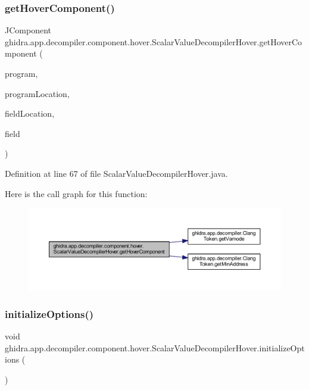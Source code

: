 \subsubsection{\texorpdfstring{getHoverComponent()}{getHoverComponent()}}
{\footnotesize\ttfamily J\+Component ghidra.\+app.\+decompiler.\+component.\+hover.\+Scalar\+Value\+Decompiler\+Hover.\+get\+Hover\+Component (\begin{DoxyParamCaption}\item[{Program}]{program,  }\item[{Program\+Location}]{program\+Location,  }\item[{Field\+Location}]{field\+Location,  }\item[{Field}]{field }\end{DoxyParamCaption})\hspace{0.3cm}{\ttfamily [inline]}}



Definition at line 67 of file Scalar\+Value\+Decompiler\+Hover.\+java.

Here is the call graph for this function\+:
\nopagebreak
\begin{figure}[H]
\begin{center}
\leavevmode
\includegraphics[width=350pt]{classghidra_1_1app_1_1decompiler_1_1component_1_1hover_1_1_scalar_value_decompiler_hover_adceeff91735d2e79e45ddf1682273d66_cgraph}
\end{center}
\end{figure}
\mbox{\label{classghidra_1_1app_1_1decompiler_1_1component_1_1hover_1_1_scalar_value_decompiler_hover_a332d88d963bf72c85ed718bfd4bac6f0}} 
\subsubsection{\texorpdfstring{initializeOptions()}{initializeOptions()}}
{\footnotesize\ttfamily void ghidra.\+app.\+decompiler.\+component.\+hover.\+Scalar\+Value\+Decompiler\+Hover.\+initialize\+Options (\begin{DoxyParamCaption}{ }\end{DoxyParamCaption})\hspace{0.3cm}{\ttfamily [inline]}}



